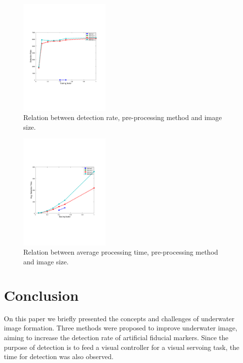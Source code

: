 \documentclass[conference, letterpaper]{IEEEtran}
\begin{document}
\begin{figure}[!ht]
	\centering
    \includegraphics[width=0.4\textwidth, trim={1.6cm 6.9cm 2.3cm 6.7cm}]{./fig/detection_rate2_emb.pdf}
    \caption{Relation between detection rate, pre-processing method and image size.}
	\label{fig:detection_rate2}
\end{figure}

\begin{figure}[!ht]
	\centering
    \includegraphics[width=0.4\textwidth, trim={1.6cm 6.9cm 2.3cm 6.7cm}]{./fig/detection_time2_emb.pdf}
    \caption{Relation between average processing time, pre-processing method and image size.}
	\label{fig:detection_time2}
\end{figure}

\section{Conclusion} \label{sec:concl}

On this paper we briefly presented the concepts and challenges of underwater
image formation. Three methods were proposed to improve underwater
image, aiming to increase the detection rate of artificial fiducial markers.
Since the purpose of detection is to feed a visual controller for a visual
servoing task, the time for detection was also observed.
\end{document}
